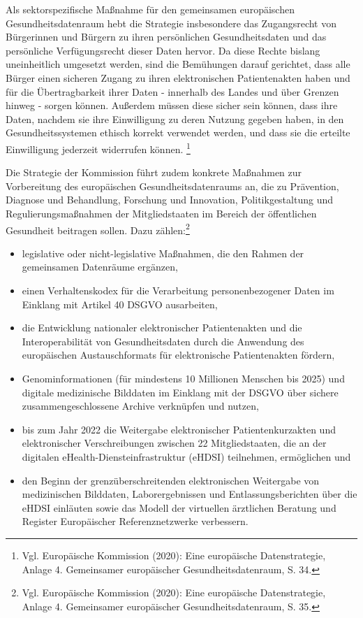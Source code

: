 Als sektorspezifische Maßnahme für den gemeinsamen europäischen Gesundheitsdatenraum hebt die Strategie insbesondere das Zugangsrecht von Bürgerinnen und Bürgern zu ihren persönlichen Gesundheitsdaten und das persönliche Verfügungsrecht dieser Daten hervor. Da diese Rechte bislang uneinheitlich umgesetzt werden, sind die Bemühungen darauf gerichtet, dass alle Bürger einen sicheren Zugang zu ihren elektronischen Patientenakten haben und für die Übertragbarkeit ihrer Daten - innerhalb des Landes und über Grenzen hinweg - sorgen können. Außerdem müssen diese sicher sein können, dass ihre Daten, nachdem sie ihre Einwilligung zu deren Nutzung gegeben haben, in den Gesundheitssystemen ethisch korrekt verwendet werden, und dass sie die erteilte Einwilligung jederzeit widerrufen können. \footnote{Vgl. Europäische Kommission (2020): Eine europäische Datenstrategie, Anlage 4. Gemeinsamer europäischer Gesundheitsdatenraum, S. 34.}

Die Strategie der Kommission führt zudem konkrete Maßnahmen zur Vorbereitung des europäischen Gesundheitsdatenraums an, die zu Prävention, Diagnose und Behandlung, Forschung und Innovation, Politikgestaltung und Regulierungsmaßnahmen der Mitgliedstaaten im Bereich der öffentlichen Gesundheit beitragen sollen. Dazu zählen:\footnote{Vgl. Europäische Kommission (2020): Eine europäische Datenstrategie, Anlage 4. Gemeinsamer europäischer Gesundheitsdatenraum, S. 35.}
\begin{itemize}
    \item legislative oder nicht-legislative Maßnahmen, die den Rahmen der gemeinsamen Datenräume ergänzen,
    \item einen Verhaltenskodex für die Verarbeitung personenbezogener Daten im Einklang mit Artikel 40 DSGVO ausarbeiten,
    \item die Entwicklung nationaler elektronischer Patientenakten und die Interoperabilität von Gesundheitsdaten durch die Anwendung des europäischen Austauschformats für elektronische Patientenakten fördern,
    \item Genominformationen (für mindestens 10 Millionen Menschen bis 2025) und digitale medizinische Bilddaten im Einklang mit der DSGVO über sichere zusammengeschlossene Archive verknüpfen und nutzen,
    \item bis zum Jahr 2022 die Weitergabe elektronischer Patientenkurzakten und elektronischer Verschreibungen zwischen 22 Mitgliedstaaten, die an der digitalen eHealth-Diensteinfrastruktur (eHDSI) teilnehmen, ermöglichen und
    \item den Beginn der grenzüberschreitenden elektronischen Weitergabe von medizinischen Bilddaten, Laborergebnissen und Entlassungsberichten über die eHDSI einläuten sowie das Modell der virtuellen ärztlichen Beratung und Register Europäischer Referenznetzwerke verbessern.
\end{itemize}

